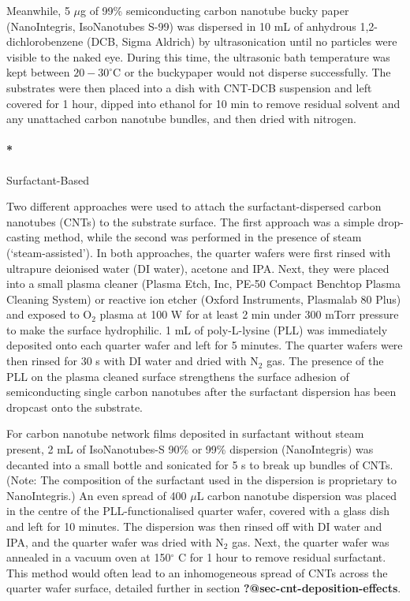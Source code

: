 \documentclass[
  letterpaper,
  DIV=11,
  numbers=noendperiod]{scrartcl}
\let\oldparagraph\paragraph
\renewcommand{\paragraph}[1]{\oldparagraph{#1}\mbox{}}
\begin{document}
Meanwhile, 5 \(\mu\)g of 99\% semiconducting carbon nanotube bucky paper
(NanoIntegris, IsoNanotubes S-99) was dispersed in 10 mL of anhydrous
1,2-dichlorobenzene (DCB, Sigma Aldrich) by ultrasonication until no
particles were visible to the naked eye. During this time, the
ultrasonic bath temperature was kept between \(20-30^\circ\)C or the
buckypaper would not disperse successfully. The substrates were then
placed into a dish with CNT-DCB suspension and left covered for 1 hour,
dipped into ethanol for 10 min to remove residual solvent and any
unattached carbon nanotube bundles, and then dried with nitrogen.

\hypertarget{surfactant-based}{%
\paragraph*{Surfactant-Based}\label{surfactant-based}}

Two different approaches were used to attach the surfactant-dispersed
carbon nanotubes (CNTs) to the substrate surface. The first approach was
a simple drop-casting method, while the second was performed in the
presence of steam (`steam-assisted'). In both approaches, the quarter
wafers were first rinsed with ultrapure deionised water (DI water),
acetone and IPA. Next, they were placed into a small plasma cleaner
(Plasma Etch, Inc, PE-50 Compact Benchtop Plasma Cleaning System) or
reactive ion etcher (Oxford Instruments, Plasmalab 80 Plus) and exposed
to O\(_2\) plasma at 100 W for at least 2 min under 300 mTorr pressure
to make the surface hydrophilic. 1 mL of poly-L-lysine (PLL) was
immediately deposited onto each quarter wafer and left for 5 minutes.
The quarter wafers were then rinsed for 30 s with DI water and dried
with N\(_2\) gas. The presence of the PLL on the plasma cleaned surface
strengthens the surface adhesion of semiconducting single carbon
nanotubes after the surfactant dispersion has been dropcast onto the
substrate.

For carbon nanotube network films deposited in surfactant without steam
present, 2 mL of IsoNanotubes-S 90\% or 99\% dispersion (NanoIntegris)
was decanted into a small bottle and sonicated for 5 s to break up
bundles of CNTs. (Note: The composition of the surfactant used in the
dispersion is proprietary to NanoIntegris.) An even spread of 400
\(\mu\)L carbon nanotube dispersion was placed in the centre of the
PLL-functionalised quarter wafer, covered with a glass dish and left for
10 minutes. The dispersion was then rinsed off with DI water and IPA,
and the quarter wafer was dried with N\(_2\) gas. Next, the quarter
wafer was annealed in a vacuum oven at 150\(^\circ\) C for 1 hour to
remove residual surfactant. This method would often lead to an
inhomogeneous spread of CNTs across the quarter wafer surface, detailed
further in section \textbf{?@sec-cnt-deposition-effects}.
\end{document}
